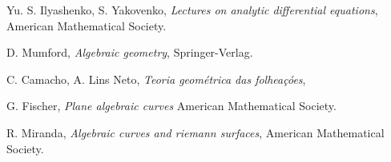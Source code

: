 \begin{thebibliography}{9}
Yu. S. Ilyashenko, S. Yakovenko,
\emph{Lectures on analytic differential equations},
American Mathematical Society.

D. Mumford, 
\emph{Algebraic geometry},
Springer-Verlag.

C. Camacho, A. Lins Neto,
\emph{Teoria geométrica das folheaçóes},

G. Fischer,
\emph{Plane algebraic curves}
American Mathematical Society.

R. Miranda,
\emph{Algebraic curves and riemann surfaces},
American Mathematical Society.
\end{thebibliography}

